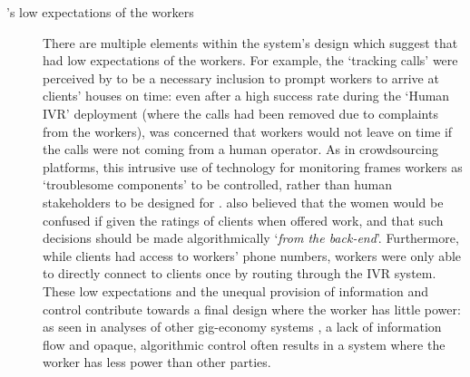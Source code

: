 \begin{description}
    \item[\PC{}'s low expectations of the workers] There are multiple elements within the system's design which suggest that \PC{} had low expectations of the workers. For example, the `tracking calls' were perceived by \PC{} to be a necessary inclusion to prompt workers to arrive at clients' houses on time: even after a high success rate during the `Human IVR' deployment (where the calls had been removed due to complaints from the workers), \PC{} was concerned that workers would not leave on time if the calls were not coming from a human operator. As in crowdsourcing platforms, this intrusive use of technology for monitoring frames workers as `troublesome components' to be controlled, rather than human stakeholders to be designed for \cite{martin2016, Irani2013}. \PC{} also believed that the women would be confused if given the ratings of clients when offered work, and that such decisions should be made algorithmically `\textit{from the back-end}'. Furthermore, while clients had access to workers' phone numbers, workers were only able to directly connect to clients once by routing through the IVR system. These low expectations and the unequal provision of information and control contribute towards a final design where the worker has little power: as seen in analyses of other gig-economy systems \cite{martin2016, Hara2018, carlos2021, lee2015}, a lack of information flow and opaque, algorithmic control often results in a system where the worker has less power than other parties. 
    

\end{description}
